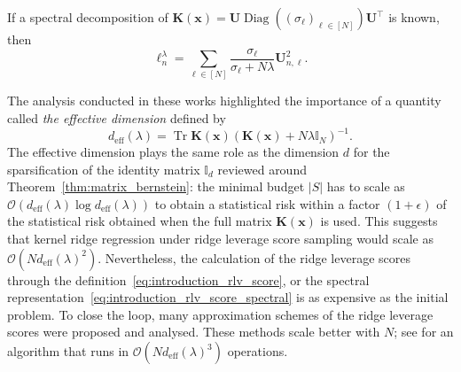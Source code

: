 \documentclass[twoside,11pt]{book}
\numberwithin{theorem}{chapter}
\numberwithin{definition}{chapter}
\numberwithin{proposition}{chapter}
\numberwithin{corollary}{chapter}
\numberwithin{example}{chapter}
\numberwithin{lemma}{chapter}
\numberwithin{assumption}{chapter}
\numberwithin{equation}{chapter}
\numberwithin{figure}{chapter}
\DeclareMathOperator{\Tr}{Tr}
\DeclareMathOperator{\Diag}{\mathrm{Diag}}
\DeclareMathOperator{\eff}{\mathrm{eff}}
\DeclareMathOperator{\Tran}{\intercal}
\begin{document}
If a spectral decomposition of $\bm{K}(\bm{x}) = \bm{U}\Diag((\sigma_{\ell})_{ \ell \in [N]})\bm{U}^{\Tran}$ is known, then 
\begin{equation}\label{eq:introduction_rlv_score_spectral}
\ell^{\lambda}_{n} = \sum\limits_{\ell \in [N]} \frac{\sigma_{\ell}}{\sigma_\ell + N\lambda}  \bm{U}_{n,\ell}^{2}.
\end{equation}

The analysis conducted in these works highlighted the importance of a quantity called \emph{the effective dimension} defined by
\begin{equation}
d_{\eff}(\lambda) = \Tr \bm{K}(\bm{x})(\bm{K}(\bm{x})+ N\lambda \mathbb{I}_{N})^{-1}.
\end{equation}
The effective dimension plays the same role as the dimension $d$ for the sparsification of the identity matrix $\mathbb{I}_{d}$ reviewed around Theorem~\ref{thm:matrix_bernstein}: the minimal  budget $|S|$ has to scale as $\mathcal{O}(d_{\eff}(\lambda) \log d_{\eff}(\lambda))$ to obtain a statistical risk within a factor $(1+\epsilon)$ of the statistical risk obtained when the full matrix $\bm{K}(\bm{x})$ is used.
 This suggests that kernel ridge regression under ridge leverage score sampling would scale as $\mathcal{O}(N d_{\eff}(\lambda)^{2})$. 
  Nevertheless, the calculation of the ridge leverage scores through the definition~\eqref{eq:introduction_rlv_score}, or the spectral representation~\eqref{eq:introduction_rlv_score_spectral} is as expensive as the initial problem. To close the loop, many approximation schemes of the ridge leverage scores were proposed and analysed. These methods scale better with $N$; see \citep*{CaLaVa17,Cal17} for an algorithm that runs in $\mathcal{O}(N d_{\eff}(\lambda)^{3})$ operations.








\end{document}
